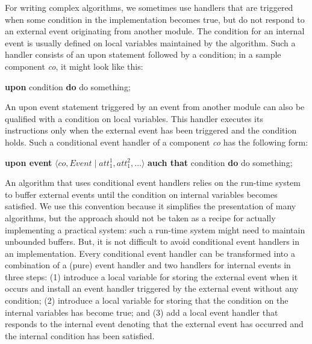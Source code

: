 \documentclass{book}
\begin{document}
For writing complex algorithms, we sometimes use handlers that are triggered when some condition in the implementation becomes true, but do not respond to an external event originating from another module.
The condition for an internal event is usually defined on local variables maintained by the algorithm. 
Such a handler consists of an upon statement followed by a condition; in a sample component \textit{co}, it might look like this:

\begin{center}
    \begin{algorithmic}
    \State \textbf{upon} condition \textbf{do}
    \State \quad do something;
    \end{algorithmic}
\end{center}

An upon event statement triggered by an event from another module can also be qualified with a condition on local variables.
This handler executes its instructions only when the external event has been triggered and the condition holds.
Such a conditional event handler of a component \textit{co} has the following form:

\begin{center}
    \begin{algorithmic}
    \State \textbf{upon event} $\langle co, Event \mid att_{1}^1, att_{1}^2, \ldots \rangle$ \textbf{auch that} condition \textbf{do}
    \State \quad do something;
    \end{algorithmic}
\end{center}

An algorithm that uses conditional event handlers relies on the run-time system to
buffer external events until the condition on internal variables becomes satisfied.
We use this convention because it simplifies the presentation of many algorithms, but the approach should not be taken as a recipe for actually implementing a practical system: such a run-time system might need to maintain unbounded buffers.
But, it is not difficult to avoid conditional event handlers in an implementation.
Every conditional event handler can be transformed into a combination of a (pure) event handler and two handlers for internal events in three steps: 
(1) introduce a local variable for storing the external event when it occurs and install an event handler triggered by the external event without any condition; 
(2) introduce a local variable for storing that the condition on the internal variables has become true; and 
(3) add a local event handler that responds to the internal event denoting that the external event has occurred and the internal condition has been satisfied.
\end{document}
